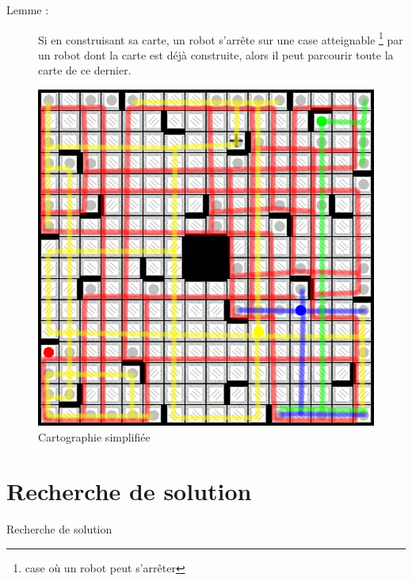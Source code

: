 \documentclass{beamer}
\begin{document}
\begin{frame}
  \vfill
  \vfill
\end{frame}

\begin{frame}
 \begin{description}
  \item[Lemme : ] Si en construisant sa carte, un robot s'arrête sur une case atteignable \footnote{case où un robot peut s'arrêter} par un robot dont la carte est d\'ej\`a construite, alors il peut parcourir toute la carte de ce dernier.
 \end{description}
\end{frame}

\begin{frame}
  \begin{figure}[htbp]
    \centering
    \includegraphics[width=.7\linewidth]{img/chemins_initiaux.png}
    \caption{Cartographie simplifi\'ee}
  \end{figure}
\end{frame}

\section{Recherche de solution}
\begin{frame}
  \vfill
  \centering Recherche de solution
  \vfill
\end{frame}
\end{document}
